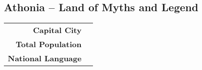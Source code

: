 \subsection{Athonia -- Land of Myths and Legend}
\begin{tabular}{r | l}
    \textbf{Capital City} & \\
    \textbf{Total Population} & \\
    \textbf{National Language}
\end{tabular}